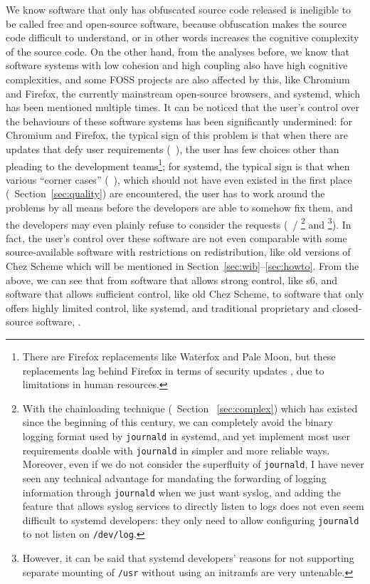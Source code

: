 We know software that only has obfuscated source code released is ineligible
to be called free and open-source software, because obfuscation makes the
source code difficult to understand, or in other words increases the cognitive
complexity of the source code.  On the other hand, from the analyses before,
we know that software systems with low cohesion and high coupling also have
high cognitive complexities, and some FOSS projects are also affected by
this, like Chromium and Firefox, the currently mainstream open-source browsers,
and systemd, which has been mentioned multiple times.  It can be noticed
that the user's control over the behaviours of these software systems has
been significantly undermined: for Chromium and Firefox, the typical sign
of this problem is that when there are updates that defy user requirements
(\eg~\parencite{beauhd2019, namelessvoice2018}), the user has few choices
other than pleading to the development teams\footnote{There are Firefox
replacements like Waterfox and Pale Moon, but these replacements lag behind
Firefox in terms of security updates \etc, due to limitations in human
resources.}; for systemd, the typical sign is that
when various ``corner cases'' (\eg~\parencite{ratagupt2017}), which should
not have even existed in the first place (\cf~Section~\ref{sec:quality})
are encountered, the user has to work around the problems by all means before
the developers are able to somehow fix them, and the developers may even
plainly refuse to consider the requests (\eg~\parencite{akcaagac2013}/%
\parencite{junta2017}\footnote{With the chainloading technique (\cf~Section~%
\ref{sec:complex}) which has existed since the beginning of this century, we
can completely avoid the binary logging format used by \texttt{journald} in
systemd, and yet implement most user requirements doable with \texttt{journald}
in simpler and more reliable ways.  Moreover, even if we do not consider the
superfluity of \texttt{journald}, I have never seen any technical advantage
for mandating the forwarding of logging information through \texttt{journald}
when we just want syslog, and adding the feature that allows syslog
services to directly listen to logs does not even seem difficult to systemd
developers: they only need to allow configuring \texttt{journald} to not
listen on \texttt{/dev/log}.} and \parencite{freedesktop:sepusr}\footnote%
{However, it can be said that systemd developers' reasons for not supporting
separate mounting of \texttt{/usr} without using an initramfs are very
untenable.}).  In fact, the user's control over
these software are not even comparable with some source-available software
with restrictions on redistribution, like old versions of Chez Scheme which
will be mentioned in Section~\ref{sec:wib}--\ref{sec:howto}.  From the above,
we can see that from software that allows strong control, like s6, and software
that allows sufficient control, like old Chez Scheme, to software that only
offers highly limited control, like systemd, and traditional proprietary and
closed-source software, .

